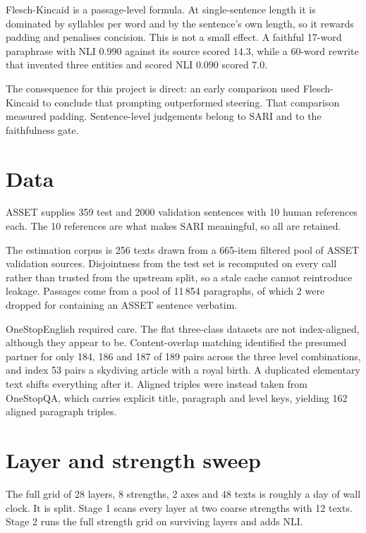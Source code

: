 \documentclass[twocolumn,10pt,a4paper]{article}
\begin{document}
Flesch-Kincaid is a passage-level formula. At single-sentence length it is
dominated by syllables per word and by the sentence's own length, so it rewards
padding and penalises concision. This is not a small effect. A faithful 17-word
paraphrase with NLI $0.990$ against its source scored $14.3$, while a 60-word
rewrite that invented three entities and scored NLI $0.090$ scored $7.0$.

The consequence for this project is direct: an early comparison used Flesch-Kincaid
to conclude that prompting outperformed steering. That comparison measured
padding. Sentence-level judgements belong to SARI and to the faithfulness gate.

\section{Data}

ASSET supplies 359 test and 2000 validation sentences with 10 human references
each. The 10 references are what makes SARI meaningful, so all are retained.

The estimation corpus is 256 texts drawn from a 665-item filtered pool of ASSET
validation sources. Disjointness from the test set is recomputed on every call
rather than trusted from the upstream split, so a stale cache cannot reintroduce
leakage. Passages come from a pool of 11\,854 paragraphs, of which 2 were dropped
for containing an ASSET sentence verbatim.

OneStopEnglish required care. The flat three-class datasets are not
index-aligned, although they appear to be. Content-overlap matching identified
the presumed partner for only 184, 186 and 187 of 189 pairs across the three
level combinations, and index 53 pairs a skydiving article with a royal birth. A
duplicated elementary text shifts everything after it. Aligned triples were
instead taken from OneStopQA, which carries explicit title, paragraph and level
keys, yielding 162 aligned paragraph triples.

\section{Layer and strength sweep}
\label{sec:sweep}

The full grid of 28 layers, 8 strengths, 2 axes and 48 texts is roughly a day of
wall clock. It is split. Stage 1 scans every layer at two coarse strengths with
12 texts. Stage 2 runs the full strength grid on surviving layers and adds NLI.
\end{document}
